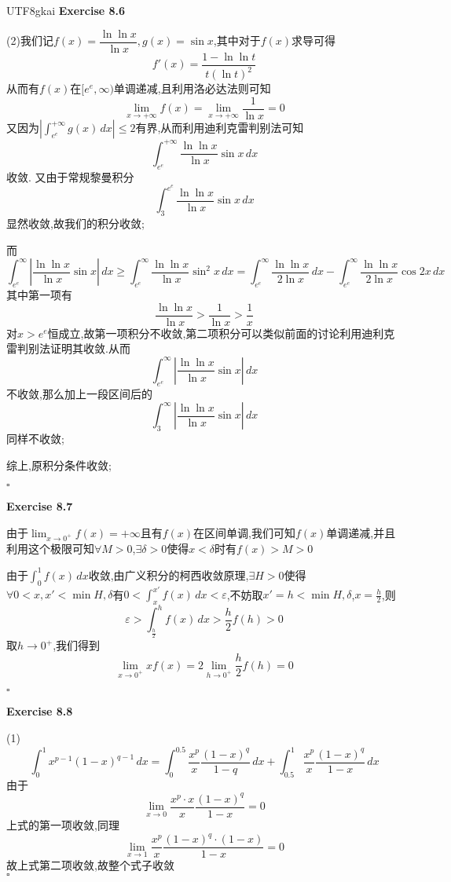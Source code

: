 \documentclass{article}
\newenvironment{exercise}[1]{%
{\textbf{Exercise #1} \\ 
    }
}{
  \hfill $\square$ 
  \par\bigskip 
}
\newcommand{\abs}[1]{\left|#1\right|}
\begin{document}
\begin{CJK}{UTF8}{gkai}
\begin{exercise}{8.6}
    (2)我们记$f(x) = \dfrac{\ln \ln x}{\ln x}, g(x) = \sin x$,其中对于$f(x)$求导可得
    \[f'(x) = \dfrac{1 - \ln \ln t}{t(\ln t)^2}\]
    从而有$f(x)$在$[e^e,\infty)$单调递减,且利用洛必达法则可知
    \[\lim_{x\to +\infty} f(x) = \lim_{x\to +\infty}\frac{1}{\ln x} = 0\]
    又因为$\abs{\int_{e^e}^{+\infty}g(x)\, dx} \leq 2$有界,从而利用迪利克雷判别法可知
    \[\int_{e^e}^{+\infty}\frac{\ln\ln x}{\ln x}\sin x \, dx\]收敛.
    又由于常规黎曼积分
    \[\int_{3}^{e^e}\frac{\ln\ln x}{\ln x}\sin x \, dx\]
    显然收敛,故我们的积分收敛;

    而
    \[\int_{e^e}^{\infty}\abs{\frac{\ln\ln x}{\ln x}\sin x }\, dx \geq \int_{e^e}^{\infty}\frac{\ln\ln x}{\ln x}\sin^2 x \, dx = \int_{e^e}^{\infty}\frac{\ln\ln x}{2\ln x} \, dx - \int_{e^e}^{\infty}\frac{\ln\ln x}{2\ln x}\cos 2x \, dx\]
    其中第一项有
    \[\frac{\ln \ln x}{\ln x} > \frac{1}{\ln x}  > \frac{1}{x}\]
    对$x > e^e$恒成立,故第一项积分不收敛,第二项积分可以类似前面的讨论利用迪利克雷判别法证明其收敛.从而
    \[\int_{e^e}^{\infty}\abs{\frac{\ln\ln x}{\ln x}\sin x }\, dx\]
    不收敛,那么加上一段区间后的
    \[\int_{3}^{\infty}\abs{\frac{\ln\ln x}{\ln x}\sin x }\, dx\]
    同样不收敛;

    综上,原积分条件收敛;
\end{exercise}

\begin{exercise}{8.7}
    由于$\lim_{x \to 0^+} f(x) = +\infty$且有$f(x)$在区间单调,我们可知$f(x)$单调递减,并且利用这个极限可知$\forall M > 0$,$\exists \delta >0$使得$x < \delta$时有$f(x) > M > 0$

    由于$\int_{0}^{1}f(x)\, dx$收敛,由广义积分的柯西收敛原理,$\exists H > 0$使得$\forall 0 < x ,x' < \min{H,\delta}$有$0 < \int_{x}^{x'}f(x)\, dx < \varepsilon$,不妨取$x' = h < \min{H,\delta}$,$x = \frac{h}{2}$,则
    \[\varepsilon > \int_{\frac{h}{2}}^{h}f(x)\, dx > \frac{h}{2}f(h) > 0\]
    取$h\to 0^+$,我们得到
    \[\lim_{x\to 0^+}xf(x) = 2 \lim_{h \to 0^+} \frac{h}{2}f(h) = 0\]
\end{exercise}

\begin{exercise}{8.8}
    (1)
    \[\int_{0}^{1}x^{p - 1}(1 - x)^{q - 1}\, dx = \int_{0}^{0.5}\frac{x^p}{x}\frac{(1 - x)^q}{1 - q}\, dx + \int_{0.5}^{1}\frac{x^p}{x}\frac{(1 - x)^q}{1 - x}\, dx\]
    由于
    \[\lim_{x \to 0} \frac{x^p\cdot x}{x}\frac{(1 - x)^q}{1 - x} = 0\]
    上式的第一项收敛,同理
    \[\lim_{x \to 1} \frac{x^p}{x}\frac{(1 - x)^q\cdot (1 - x)}{1 - x} = 0\]
    故上式第二项收敛,故整个式子收敛\\


\end{exercise}
\end{CJK}
\end{document}

